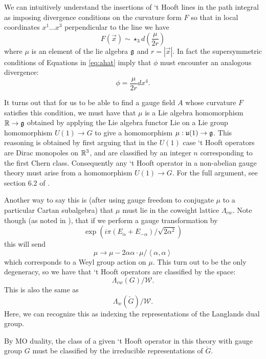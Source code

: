 	We can intuitively understand the insertions of `t Hooft lines in the path integral as imposing divergence conditions on the curvature form $F$ so that in local coordinates $x^1 \dots x^3$ perpendicular to the line we have
		\begin{equation}\label{eq:AmodF}
			F(\vec{x}) \sim \star_3 d\left( \frac{\mu}{2r} \right)
		\end{equation}
		where $\mu$ is an element of the lie algebra $\frak g$ and $r = |\vec x|$. 
		In fact the supersymmetric conditions of Equations in \eqref{eq:ahat} imply that $\phi$ must encounter an analogous divergence:
		\begin{equation}\label{eq:Amodphi}
			\phi = \frac{\mu}{2r} dx^4.
		\end{equation}
		
		It turns out that for us to be able to find a gauge field $A$ whose curvature $F$ satisfies this condition, we must have that $\mu$ is a Lie algebra homomorphism $\mathbb R \to \frak g$ obtained by applying the Lie algebra functor $\mathrm{Lie}$ on a Lie group homomorphism $U(1) \to G$ to give a homomorphism $\mu: \frak u(1) \to \gg$. This reasoning is obtained by first arguing that in the $U(1)$ case `t Hooft operators are Dirac monopoles on $\rr^3$, and are classified by an integer $n$ corresponding to the first Chern class. Consequently any `t Hooft operator in a non-abelian gauge theory must arise from a homomorphism $U(1)\to G$. For the full argument, see section 6.2 of \cite{kapustin2006}.
		
		
		Another way to say this is (after using gauge freedom to conjugate $\mu$ to a particular Cartan subalgebra) that $\mu$ must lie in the coweight lattice $\Lambda_{cw}$. Note though (as noted in \cite{goddard1977}), that if we perform a gauge transformation by
		\[
			\exp(i \pi (E_\alpha + E_{-\alpha})/\sqrt{2 \alpha^2})	
		\]
		this will send
		\[
			\mu \to \mu - 2 \alpha \alpha \cdot \mu/\left<\alpha, \alpha\right>
		\]
		which corresponds to a Weyl group action on $\mu$. This turn out to be the only degeneracy, so we have that `t Hooft operators are classified by the space:
		\[
			\Lambda_{cw}(G)/\mathcal W.
		\]
		This is also the same as 
		\[
			\Lambda_{w}(\check G)/\mathcal W.	
		\]
		Here, we can recognize this as indexing the representations of the Langlands dual group. 
		\begin{obs}
			By MO duality, the class of a given `t Hooft operator in this theory with gauge group $G$ must be classified by the irreducible representations of $\check G$.
		\end{obs}
		
